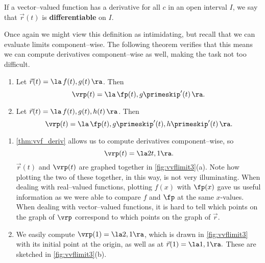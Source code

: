 If a vector--valued function has a derivative for all $c$ in an open interval $I$, we say that $\vec r(t)$ is \textbf{differentiable} on $I$.

Once again we might view this definition as intimidating, but recall that we can evaluate limits component--wise. The following theorem verifies that this means we can compute derivatives component--wise as well, making the task not too difficult.

{\begin{enumerate}
	\item Let $\vec r(t) = \la \, f(t), g(t)\,\ra$. Then 
	$$\vrp(t) = \la\, \fp(t), g\primeskip'(t)\, \ra.$$
	\item Let $\vec r(t) = \la \, f(t), g(t), h(t)\,\ra$. Then
	$$\vrp(t) = \la\, \fp(t), g\primeskip'(t), h\primeskip'(t)\, \ra.$$
\end{enumerate}}

{\begin{enumerate}
\item	\autoref{thm:vvf_deriv} allows us to compute derivatives component--wise, so
$$\vrp(t) = \la 2t, 1\ra.$$
$\vec r(t)$ and $\vrp(t)$ are graphed together in \autoref{fig:vvflimit3}(a). Note how plotting the two of these together, in this way, is not very illuminating. When dealing with real--valued functions, plotting $f(x)$ with $\fp(x)$ gave us useful information as we were able to compare $f$ and $\fp$ at the same $x$-values. When dealing with vector--valued functions, it is hard to tell which points on the graph of $\vrp$ correspond to which points on the graph of $\vec r$.

\item	We easily compute $\vrp(1) = \la 2,1\ra$, which is drawn in \autoref{fig:vvflimit3} with its initial point at the origin, as well as at $\vec r(1) = \la 1,1\ra.$ These are sketched in \autoref{fig:vvflimit3}(b).\eoehere
\end{enumerate}}

